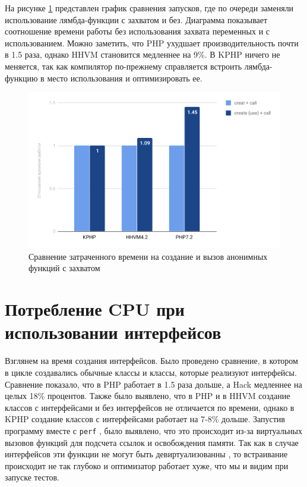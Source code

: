 На рисунке \ref{fig:benchmark-create_use_call-simple} представлен график сравнения запусков, где по очереди заменяли использование лямбда-функции с захватом и без.
Диаграмма показывает соотношение времени работы без использования захвата переменных и с использованием.
Можно заметить, что PHP ухудшает производительность почти в 1.5 раза, однако HHVM становится медленнее на 9\%.
В KPHP ничего не меняется, так как компилятор по-прежнему справляется встроить лямбда-функцию в место использования и оптимизировать ее.
\begin{figure}[H]
    \caption{Сравнение затраченного времени на создание и вызов анонимных функций с захватом}
    \label{fig:benchmark-create_use_call-simple}
    \centering
    \includegraphics[width=\linewidth]{images/benchmark_create_use_call_simple}
\end{figure}

\section{Потребление CPU при использовании интерфейсов}
Взглянем на время создания интерфейсов.
Было проведено сравнение, в котором в цикле создавались обычные классы и классы, которые реализуют интерфейсы.
Сравнение показало, что в PHP работает в 1.5 раза дольше, а Hack медленнее на целых 18\% процентов.
Также было выявлено, что в PHP и в HHVM создание классов с интерфейсами и без интерфейсов не отличается по времени,
однако в KPHP создание классов с интерфейсами работает на 7-8\% дольше.
Запустив программу вместе с \verb|perf| \cite{perf}, было выявлено, что это происходит из-за виртуальных вызовов функций для подсчета ссылок и освобождения памяти.
Так как в случае интерфейсов эти функции не могут быть девиртуализованны \cite{devirtualization}, то встраивание происходит не так глубоко и оптимизатор работает хуже, что мы и видим при запуске тестов.

